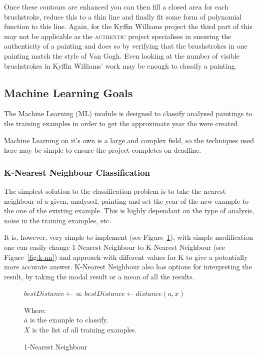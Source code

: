 \documentclass[11pt,fleqn,twoside]{article}
\begin{document}
Once these contours are enhanced you can then fill a closed area for each brushstroke, reduce this 
to a thin line and finally fit some form of polynomial function to this line. Again, for the Kyffin
Williams project the third part of this may not be applicable as the \textsc{authentic} project
specialises in ensuring the authenticity of a painting and does so by verifying that the 
brushstrokes in one painting match the style of Van Gogh. Even looking at the number of visible
brushstrokes in Kyffin Williams' work may be enough to classify a painting.

\subsection{Machine Learning Goals}
The Machine Learning (ML) module is designed to classify analysed paintings to the training 
examples in order to get the approximate year the were created.

Machine Learning on it's own is a large and complex field, so the techniques used here may be
simple to ensure the project completes on deadline.

\subsubsection{K-Nearest Neighbour Classification}
The simplest solution to the classification problem is to take the nearest neighbour of a given,
analysed, painting and set the year of the new example to the one of the existing example. This
is highly dependant on the type of analysis, noise in the training examples, etc.

It is, however, very simple to implement (see Figure~\ref{fig:1-nn}), with simple modification
one can easily change 1-Nearest Neighbour to K-Nearest Neighbour (see Figure~\ref{fig:k-nn}) and
approach with different values for K to give a potentially more accurate answer. K-Nearest 
Neighbour also has options for interpreting the result, by taking the modal result or a mean of all
the results.

\begin{figure}
\begin{algorithmic}
\State $bestDistance \gets \infty$
		\State $bestDistance \gets distance(a, x)$
	\EndIf
\EndFor
\end{algorithmic}

Where:\\
\(a\) is the example to classify.\\
\(X\) is the list of all training examples.
\caption{1-Nearest Neighbour}
\label{fig:1-nn}
\end{figure}
\end{document}
